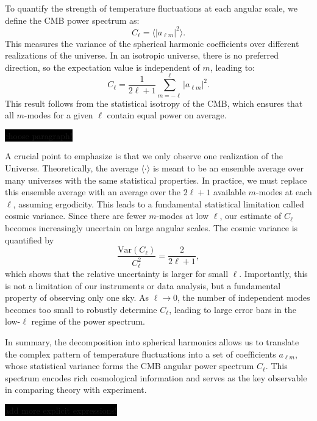 \documentclass{aa}
\numberwithin{equation}{section}
\numberwithin{table}{section}
\numberwithin{figure}{section}
\begin{document}
To quantify the strength of temperature fluctuations at each angular scale, we define the CMB power spectrum as:
\begin{equation}
C_\ell = \langle |a_{\ell m}|^2 \rangle.
\end{equation}
This measures the variance of the spherical harmonic coefficients over different realizations of the universe. In an isotropic universe, there is no preferred direction, so the expectation value is independent of $m$, leading to:
\begin{equation}
C_\ell = \frac{1}{2\ell+1} \sum_{m=-\ell}^{\ell} |a_{\ell m}|^2.
\end{equation}
This result follows from the statistical isotropy of the CMB, which ensures that all $m$-modes for a given $\ell$ contain equal power on average.  

\colorbox{black}{choose paragraph!}

A crucial point to emphasize is that we only observe one realization of the Universe. Theoretically, the average $\langle \cdot \rangle$ is meant to be an ensemble average over many universes with the same statistical properties. In practice, we must replace this ensemble average with an average over the $2\ell + 1$ available $m$-modes at each $\ell$, assuming ergodicity. This leads to a fundamental statistical limitation called cosmic variance. Since there are fewer $m$-modes at low $\ell$, our estimate of $C_\ell$ becomes increasingly uncertain on large angular scales. The cosmic variance is quantified by  
\begin{equation}
\frac{\mathrm{Var}(C_\ell)}{C_\ell^2} = \frac{2}{2\ell + 1},
\end{equation}
which shows that the relative uncertainty is larger for small $\ell$. Importantly, this is not a limitation of our instruments or data analysis, but a fundamental property of observing only one sky. As $\ell \to 0$, the number of independent modes becomes too small to robustly determine $C_\ell$, leading to large error bars in the low-$\ell$ regime of the power spectrum.

In summary, the decomposition into spherical harmonics allows us to translate the complex pattern of temperature fluctuations into a set of coefficients $a_{\ell m}$, whose statistical variance forms the CMB angular power spectrum $C_\ell$. This spectrum encodes rich cosmological information and serves as the key observable in comparing theory with experiment. 

\colorbox{black}{add more explicit expressions!}
\color{black}
\end{document}
